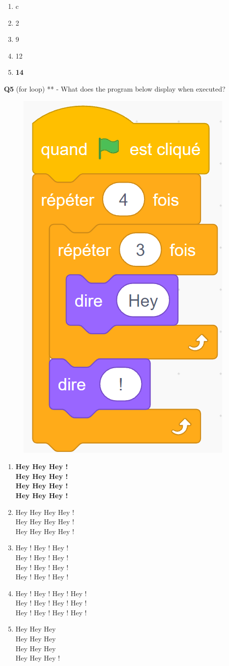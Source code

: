 \documentclass[14pt]{extarticle}
\begin{document}
\begin{enumerate}[label=\alph*)]
    \item c
    \item 2
    \item 9
    \item 12
    \item \textbf{14}
\end{enumerate}
\newpage
\textbf{Q5} (for loop) ** - What does the program below display when executed?
\begin{figure}[H]
    \centering
    \includegraphics[width=0.35\linewidth]{images/pretest/_Q5.png}
\end{figure}
\begin{enumerate}[label=\alph*)]
    \item \textbf{Hey Hey Hey ! \\
Hey Hey Hey ! \\
Hey Hey Hey ! \\
Hey Hey Hey !}

    \item Hey Hey Hey Hey ! \\
Hey Hey Hey Hey ! \\
Hey Hey Hey Hey !

    \item Hey ! Hey ! Hey ! \\
Hey ! Hey ! Hey ! \\
Hey ! Hey ! Hey ! \\
Hey ! Hey ! Hey !
 
    \item Hey ! Hey ! Hey ! Hey ! \\
Hey ! Hey ! Hey ! Hey ! \\
Hey ! Hey ! Hey ! Hey !

    \item Hey Hey Hey \\
Hey Hey Hey \\
Hey Hey Hey \\
Hey Hey Hey !

\end{enumerate}
\end{document}
